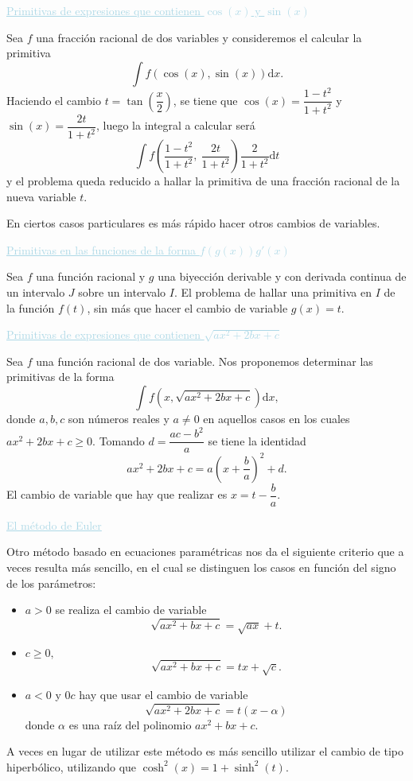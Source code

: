 \textcolor{lightblue}{\underline{Primitivas de expresiones que contienen $\cos(x)$ y $\sin(x)$}}

Sea $f$ una fracción racional de dos variables y consideremos el calcular la primitiva \[ \int f\left(\cos(x),\sin(x)\right)\mathrm{d}x. \]
Haciendo el cambio $t=\tan\left(\dfrac{x}{2}\right)$, se tiene que $\cos(x)=\dfrac{1-t^2}{1+t^2}$ y $\sin(x)=\dfrac{2t}{1+t^2}$, luego la integral a calcular será \[ \int f\left(\dfrac{1-t^2}{1+t^2},~\dfrac{2t}{1+t^2}\right)\dfrac{2}{1+t^2}\mathrm{d}t \] y el problema queda reducido a hallar la primitiva de una fracción racional de la nueva variable $t$.

En ciertos casos particulares es más rápido hacer otros cambios de variables.

\textcolor{lightblue}{\underline{Primitivas en las funciones de la forma $f(g(x))g'(x)$}}

Sea $f$ una función racional y $g$ una biyección derivable y con derivada continua de un intervalo $J$ sobre un intervalo $I$. El problema de hallar una primitiva en $I$ de la función $f(t)$, sin más que hacer el cambio de variable $g(x)=t$.

\textcolor{lightblue}{\underline{Primitivas de expresiones que contienen $\sqrt{ax^2+2bx+c}$}}

Sea $f$ una función racional de dos variable. Nos proponemos determinar las primitivas de la forma \[ \int f(x,\sqrt{ax^2+2bx+c})\mathrm{d}x, \] donde $a,b,c$ son números reales y $a\neq0$ en aquellos casos en los cuales $ax^2+2bx+c\ge0$. Tomando $d=\dfrac{ac-b^2}{a}$ se tiene la identidad \[ ax^2+2bx+c=a\left(x+\dfrac{b}{a}\right)^2+d. \]El cambio de variable que hay que realizar es $x=t-\dfrac{b}{a}$.

\textcolor{lightblue}{\underline{El método de Euler}}

Otro método basado en ecuaciones paramétricas nos da el siguiente criterio que a veces resulta más sencillo, en el cual se distinguen los casos en función del signo de los parámetros:
\begin{itemize}
	\item $a>0$ se realiza el cambio de variable \[ \sqrt{ax^2+bx+c}=\sqrt{ax}+t. \]
	\item $c\ge 0,$\[ \sqrt{ax^2+bx+c}=tx+\sqrt{c}. \]
	\item $a<0$ y $0c$ hay que usar el cambio de variable \[ \sqrt{ax^2+2bx+c}=t(x-\alpha) \] donde $\alpha$ es una raíz del polinomio $ax^2+bx+c$.
\end{itemize}
A veces en lugar de utilizar este método es más sencillo utilizar el cambio de tipo hiperbólico, utilizando que $\cosh^2(x)=1+\sinh^2(t)$.

